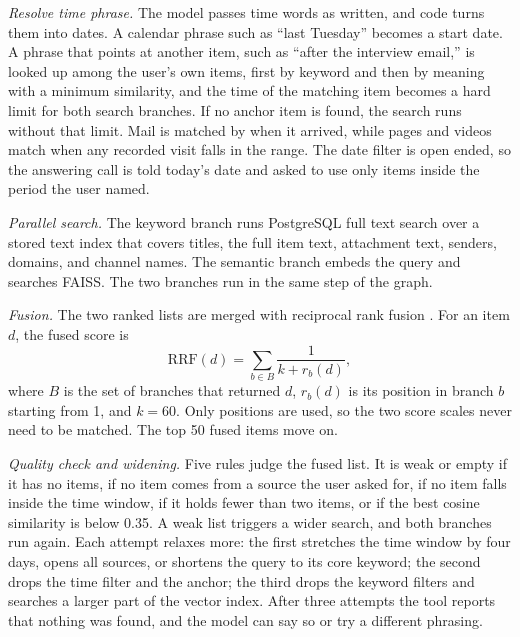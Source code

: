 \documentclass[conference]{IEEEtran}
\begin{document}
\textit{Resolve time phrase.} The model passes time words as written, and code turns them into dates. A calendar phrase such as ``last Tuesday'' becomes a start date. A phrase that points at another item, such as ``after the interview email,'' is looked up among the user's own items, first by keyword and then by meaning with a minimum similarity, and the time of the matching item becomes a hard limit for both search branches. If no anchor item is found, the search runs without that limit. Mail is matched by when it arrived, while pages and videos match when any recorded visit falls in the range. The date filter is open ended, so the answering call is told today's date and asked to use only items inside the period the user named.

\textit{Parallel search.} The keyword branch runs PostgreSQL full text search over a stored text index that covers titles, the full item text, attachment text, senders, domains, and channel names. The semantic branch embeds the query and searches FAISS. The two branches run in the same step of the graph.

\textit{Fusion.} The two ranked lists are merged with reciprocal rank fusion \cite{b9}. For an item $d$, the fused score is
\begin{equation}
\mathrm{RRF}(d) = \sum_{b \in B} \frac{1}{k + r_b(d)}, \label{eq:rrf}
\end{equation}
where $B$ is the set of branches that returned $d$, $r_b(d)$ is its position in branch $b$ starting from 1, and $k = 60$. Only positions are used, so the two score scales never need to be matched. The top 50 fused items move on.

\textit{Quality check and widening.} Five rules judge the fused list. It is weak or empty if it has no items, if no item comes from a source the user asked for, if no item falls inside the time window, if it holds fewer than two items, or if the best cosine similarity is below 0.35. A weak list triggers a wider search, and both branches run again. Each attempt relaxes more: the first stretches the time window by four days, opens all sources, or shortens the query to its core keyword; the second drops the time filter and the anchor; the third drops the keyword filters and searches a larger part of the vector index. After three attempts the tool reports that nothing was found, and the model can say so or try a different phrasing.
\end{document}
